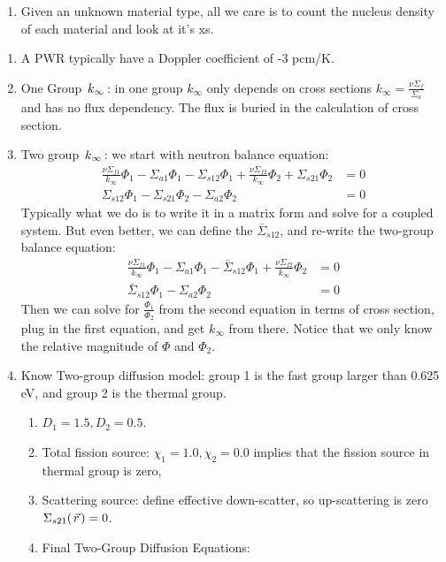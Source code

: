 \documentclass{school-22.211-notes}
\begin{document}
\begin{enumerate}
\item Given an unknown material type, all we care is to count the nucleus density of each material and look at it's xs. 
\end{enumerate}


\clearpage
{} 




\clearpage
{}
\begin{enumerate}
\item A PWR typically have a Doppler coefficient of -3 pcm/K. 

\item One Group $\left. k_{\infty} \right.$: in one group $k_{\infty}$ only depends on cross sections $k_{\infty} = \frac{\nu \Sigma_f}{\Sigma_a}$ and has no flux dependency. The flux is buried in the calculation of cross section.

\item Two group $\left. k_{\infty} \right.$: we start with neutron balance equation:
  \begin{align}
    \frac{\nu \Sigma_{f1}}{k_{\infty}} \Phi_1 - \Sigma_{a1} \Phi_1 - \Sigma_{s12} \Phi_1 + \frac{\nu \Sigma_{f2}}{k_{\infty}} \Phi_2 + \Sigma_{s21} \Phi_2 &= 0 \\
\Sigma_{s12} \Phi_1 - \Sigma_{s21} \Phi_2 - \Sigma_{a2} \Phi_2 &= 0 
  \end{align}
  Typically what we do is to write it in a matrix form and solve for a coupled system. But even better, we can define the  $\bar{\Sigma}_{s12}$, and re-write the two-group balance equation: 
  \begin{align}
    \frac{\nu \Sigma_{f1}}{k_{\infty}} \Phi_1 - \Sigma_{a1} \Phi_1 - \bar{\Sigma}_{s12} \Phi_1 + \frac{\nu \Sigma_{f2}}{k_{\infty}} \Phi_2 &= 0 \\
    \bar{\Sigma}_{s12} \Phi_1- \Sigma_{a2} \Phi_2 &= 0 
  \end{align}
  Then we can solve for $\frac{\Phi_1}{\Phi_2}$ from the second equation in terms of cross section, plug in the first equation, and get $k_{\infty}$ from there. Notice that we only know the relative magnitude of $\Phi$ and $\Phi_2$. 

\item Know Two-group diffusion model: group 1 is the fast group larger than 0.625 eV, and group 2 is the thermal group. 
\begin{enumerate}
\item $D_1 = 1.5, D_2 = 0.5$.
\item Total fission source: $\chi_1 = 1.0, \chi_2 = 0.0$ implies that the fission source in thermal group is zero,
\item Scattering source: define effective down-scatter, so up-scattering is zero $\Sigma_{s21} (\left.\vec{r}\right.) = 0$. 
\item Final Two-Group Diffusion Equations: 
\end{enumerate}


\end{enumerate}
\end{document}
